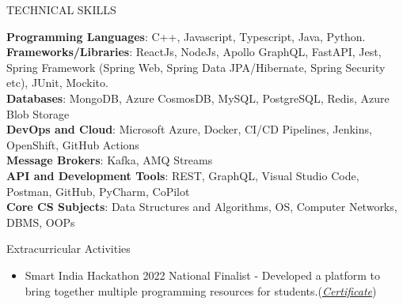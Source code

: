 \documentclass{resume} %
\newcommand\invisible[1]{\textcolor{white}{\fontsize{0}{0}#1}}
\begin{document}
\begin{rSection}{TECHNICAL SKILLS}




\textbf{Programming Languages}: {\normalfont C++, Javascript, Typescript, Java, Python.}
\\
\textbf{Frameworks/Libraries}: {\normalfont ReactJs, NodeJs, Apollo GraphQL, FastAPI, Jest, Spring Framework (Spring Web, Spring Data JPA/Hibernate, Spring Security etc), JUnit, Mockito.}
 \\
 \textbf{Databases}: {\normalfont MongoDB, Azure CosmosDB, MySQL, PostgreSQL, Redis, Azure Blob Storage}
 \\
 \textbf{DevOps and Cloud}: {\normalfont Microsoft Azure, Docker, CI/CD Pipelines, Jenkins, OpenShift, GitHub Actions}
 \\
 \textbf{Message Brokers}: {\normalfont Kafka, AMQ Streams}  
 \\
 \textbf{API and Development Tools}: {\normalfont REST, GraphQL, Visual Studio Code, Postman, GitHub, PyCharm, CoPilot}
\\ \textbf{Core CS Subjects}: {\normalfont Data Structures and Algorithms, OS, Computer Networks, DBMS, OOPs}
\end{rSection}


\begin{rSection}{Extracurricular Activities}

\begin{itemize}
   \item {Smart India Hackathon 2022 National Finalist} - {\normalfont Developed a platform to bring together multiple programming resources for students.}{\normalfont (\href{https://drive.google.com/file/d/1No-u1sUaclG-nf7_Gtym5JDEz1ydyRSL/view?usp=sharing}{\emph{Certificate}})}

\end{itemize}
\end{rSection}





\end{document}
